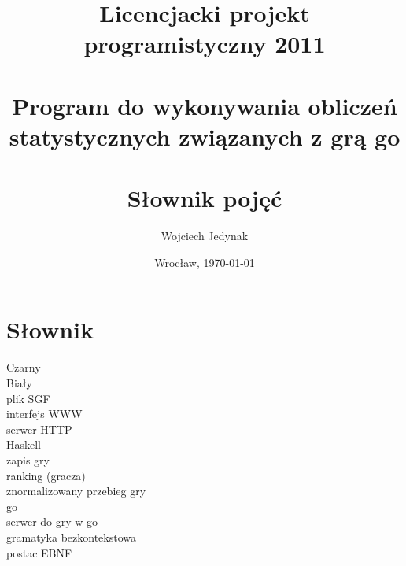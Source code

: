 \documentclass[10pt,leqno]{article}
\title{\LARGE Licencjacki projekt programistyczny 2011 \\ 
       \ \\
       Program do wykonywania obliczeń statystycznych związanych z grą go \\ 
       \ \\
       Słownik pojęć }
\author{Wojciech Jedynak}
\date{Wrocław, \today}
\begin{document}
\maketitle 

\thispagestyle{empty}

\newpage

\section{Słownik}
Czarny \\
Biały \\
plik SGF \\
interfejs WWW \\
serwer HTTP \\
Haskell \\
zapis gry \\
ranking (gracza) \\
znormalizowany przebieg gry \\
go \\
serwer do gry w go \\
gramatyka bezkontekstowa \\
postac EBNF \\ 

\end{document}
